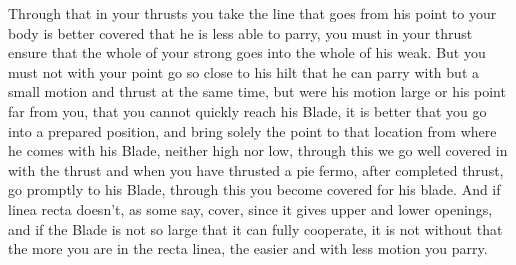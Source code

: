 \newpage


\newpage



Through that in your thrusts you take the line that goes from his point
to your body is better covered that he is less able to parry, you must
in your thrust ensure that the whole of your strong goes into the
whole of his weak. But you must not with your point go so close to his
hilt that he can parry with but a small motion and thrust at the same
time, but were his motion large or his point far from you, that you
cannot quickly reach his Blade, it is better that you go into a
prepared position, and bring solely the point to that location from
where he comes with his Blade, neither high nor low, through this we
go well covered in with the thrust and when you have thrusted a pie
fermo, after completed thrust, go promptly to his Blade, through this
you become covered for his blade. And if linea recta doesn't, as some
say, cover, since it gives upper and lower openings, and if the Blade
is not so large that it can fully cooperate, it is not without that
the more you are in the recta linea, the easier and with less motion
you parry.


